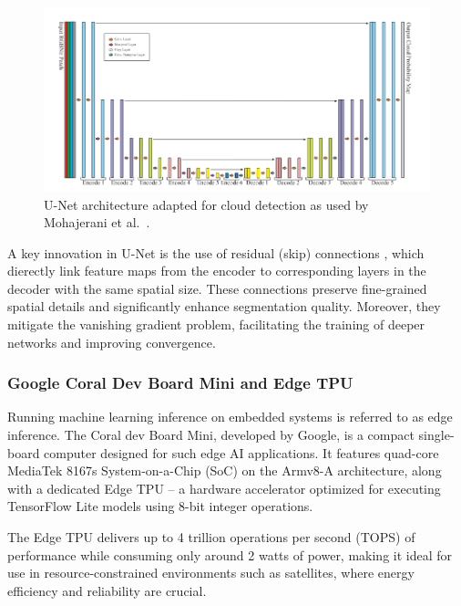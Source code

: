 {\begin{figure}[H]
  \centering
  \includegraphics[width=\textwidth]{files/U-Net_cloud_detection.png}
  \caption{U-Net architecture adapted for cloud detection as used by Mohajerani et al.~\cite{mohajerani2019cloudnet}.}
  \label{fig:unet-architecture}
\end{figure}


A key innovation in U-Net is the use of residual (skip) connections \cite{he2015deepresiduallearningimage}, which dierectly link feature maps from the encoder to corresponding layers in the decoder with the same spatial size. These connections preserve fine-grained spatial details and significantly enhance segmentation quality. Moreover, they mitigate the vanishing gradient problem, facilitating the training of deeper networks and improving convergence.

\subsubsection{Google Coral Dev Board Mini and Edge TPU}

Running machine learning inference on embedded systems is referred to as edge inference. The Coral dev Board Mini, developed by Google, is a compact single-board computer designed for such edge AI applications. It features quad-core MediaTek 8167s System-on-a-Chip (SoC) on the Armv8-A architecture, along with a dedicated Edge TPU – a hardware accelerator optimized for executing TensorFlow Lite models using 8-bit integer operations.

The Edge TPU delivers up to 4 trillion operations per second (TOPS) of performance while consuming only around 2 watts of power, making it ideal for use in resource-constrained environments such as satellites, where energy efficiency and reliability are crucial.

}
